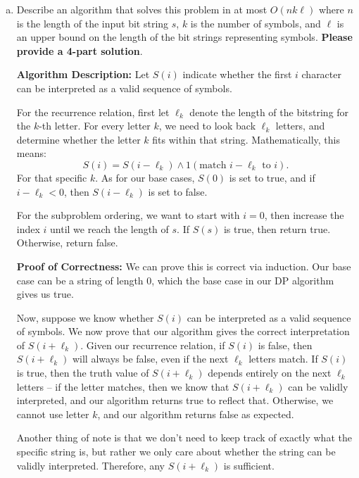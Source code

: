 \documentclass[11pt]{article}
\begin{document}
\begin{enumerate}[(a)]
    \item Describe an algorithm that solves this problem in at most $O(n k \ell)$ where $n$ is the length of the input bit string $s$, $k$ is the number of symbols, and $\ell$ is an upper bound on the length of the bit strings representing symbols. \textbf{Please provide a 4-part solution}.

	\begin{solution}

		\textbf{Algorithm Description:} Let $S(i)$ indicate whether the first $i$ character can be 
		interpreted as a valid sequence of symbols. 

		For the recurrence relation, first let $\ell_k$ denote the length of the bitstring for the $k$-th letter.
		For every letter $k$, we need to look back $\ell_k$ letters, and determine whether the letter
		$k$ fits within that string. Mathematically, this means:
		\[
			S(i) = S(i - \ell_k) \land 1(\text{match $i - \ell_k$ to $i$})
		.\]
		For that specific $k$. As for our base cases, $S(0)$ is set to true, and if $i - \ell_k < 0$, 
		then $S(i - \ell_k)$ is set to false.

		For the subproblem ordering, we want to start with $i = 0$, then increase the index $i$ until 
		we reach the length of $s$. If $S(s)$ is true, then return true. Otherwise, return false. 

		\textbf{Proof of Correctness:} We can prove this is correct via induction. Our base case 
		can be a string of length 0, which the base case in our DP algorithm gives us true. 
	
		Now, suppose 
		we know whether $S(i)$ can be interpreted as a valid sequence of symbols. We now prove that 
		our algorithm gives the correct interpretation of $S(i + \ell_k)$. Given our recurrence 
		relation, if $S(i)$ is false, then $S(i + \ell_k)$ will always be false, even if the next 
		$\ell_k$ letters match. If $S(i)$ is true, then the truth value of $S(i + 
		\ell_k)$ depends entirely on the next $\ell_k$ letters -- if the letter matches, then we know that 
		$S(i + \ell_k)$ can be validly interpreted, and our algorithm returns true to reflect that. 
		Otherwise, we cannot use letter $k$, and our algorithm returns false as expected. 

		Another thing of note is that we don't need to keep track of exactly what the specific string 
		is, but rather we only care about whether the string can be validly interpreted. Therefore, 
		any $S(i + \ell_k)$ is sufficient.


\end{solution}
\end{enumerate}
\end{document}
